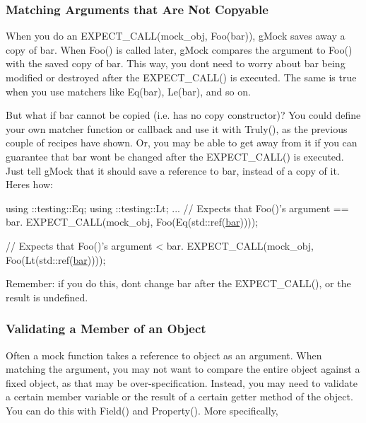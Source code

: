 \subsubsection*{Matching Arguments that Are Not Copyable}

When you do an {\ttfamily E\+X\+P\+E\+C\+T\+\_\+\+C\+A\+L\+L(mock\+\_\+obj, Foo(bar))}, g\+Mock saves away a copy of {\ttfamily bar}. When {\ttfamily Foo()} is called later, g\+Mock compares the argument to {\ttfamily Foo()} with the saved copy of {\ttfamily bar}. This way, you don\textquotesingle{}t need to worry about {\ttfamily bar} being modified or destroyed after the {\ttfamily E\+X\+P\+E\+C\+T\+\_\+\+C\+A\+L\+L()} is executed. The same is true when you use matchers like {\ttfamily Eq(bar)}, {\ttfamily Le(bar)}, and so on.

But what if {\ttfamily bar} cannot be copied (i.\+e. has no copy constructor)? You could define your own matcher function or callback and use it with {\ttfamily Truly()}, as the previous couple of recipes have shown. Or, you may be able to get away from it if you can guarantee that {\ttfamily bar} won\textquotesingle{}t be changed after the {\ttfamily E\+X\+P\+E\+C\+T\+\_\+\+C\+A\+L\+L()} is executed. Just tell g\+Mock that it should save a reference to {\ttfamily bar}, instead of a copy of it. Here\textquotesingle{}s how\+:


\begin{DoxyCode}
using ::testing::Eq;
using ::testing::Lt;
...
  \textcolor{comment}{// Expects that Foo()'s argument == bar.}
  EXPECT\_CALL(mock\_obj, Foo(Eq(std::ref(\mbox{\hyperlink{namespacebar}{bar}}))));

  \textcolor{comment}{// Expects that Foo()'s argument < bar.}
  EXPECT\_CALL(mock\_obj, Foo(Lt(std::ref(\mbox{\hyperlink{namespacebar}{bar}}))));
\end{DoxyCode}


Remember\+: if you do this, don\textquotesingle{}t change {\ttfamily bar} after the {\ttfamily E\+X\+P\+E\+C\+T\+\_\+\+C\+A\+L\+L()}, or the result is undefined.

\subsubsection*{Validating a Member of an Object}

Often a mock function takes a reference to object as an argument. When matching the argument, you may not want to compare the entire object against a fixed object, as that may be over-\/specification. Instead, you may need to validate a certain member variable or the result of a certain getter method of the object. You can do this with {\ttfamily Field()} and {\ttfamily Property()}. More specifically,


